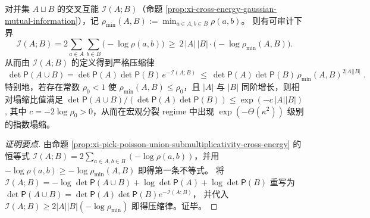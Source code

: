 \begin{corollary}\label{cor:xi-cross-energy-lower-bound-by-min-separation}
对并集 \(A\sqcup B\) 的交叉互能 \(\mathcal I(A;B)\)（命题 \ref{prop:xi-cross-energy-gaussian-mutual-information}），记
\(
\rho_{\min}(A,B):=\min_{a\in A,b\in B}\rho(a,b)
\)。
则有可审计下界
\[
\boxed{\;
\mathcal I(A;B)
=2\sum_{a\in A}\sum_{b\in B}\bigl(-\log\rho(a,b)\bigr)
\ \ge\
2\,|A|\,|B|\cdot\bigl(-\log\rho_{\min}(A,B)\bigr).\;}
\]
从而由 \(\mathcal I(A;B)\) 的定义得到严格压缩律
\[
\boxed{\;
\det\mathsf P(A\cup B)
=\det\mathsf P(A)\det\mathsf P(B)\,e^{-\mathcal I(A;B)}
\ \le\
\det\mathsf P(A)\det\mathsf P(B)\,\rho_{\min}(A,B)^{2|A||B|}\; }.
\]
特别地，若存在常数 \(\rho_0<1\) 使 \(\rho_{\min}(A,B)\le \rho_0\)，且 \(|A|\) 与 \(|B|\) 同阶增长，则相对塌缩比值满足
\(
\det\mathsf P(A\cup B)\big/(\det\mathsf P(A)\det\mathsf P(B))
\le \exp(-c\,|A||B|)
\),
其中 \(c=-2\log\rho_0>0\)，从而在宏观分裂 regime 中出现 \(\exp(-\Theta(\kappa^2))\) 级别的指数塌缩。
\end{corollary}
\begin{proof}[证明要点]
由命题 \ref{prop:xi-pick-poisson-union-submultiplicativity-cross-energy} 的恒等式
\(\mathcal I(A;B)=2\sum_{a\in A,b\in B}(-\log\rho(a,b))\)，并用
\(-\log\rho(a,b)\ge -\log\rho_{\min}(A,B)\) 即得第一条不等式。
将 \(\mathcal I(A;B)=-\log\det\mathsf P(A\cup B)+\log\det\mathsf P(A)+\log\det\mathsf P(B)\) 重写为
\(
\det\mathsf P(A\cup B)=\det\mathsf P(A)\det\mathsf P(B)e^{-\mathcal I(A;B)}
\)，
并代入 \(\mathcal I(A;B)\ge 2|A||B|(-\log\rho_{\min})\) 即得压缩律。证毕。
\end{proof}

